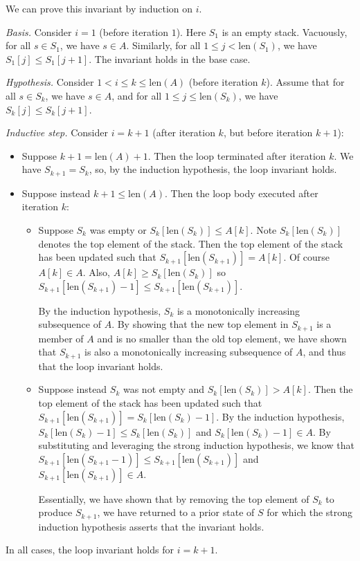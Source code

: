 \begin{enumerate}
\begin{solution}
We can prove this invariant by induction on $i$.

\textit{Basis. }Consider $i=1$ (before iteration $1$). Here $S_1$ is an empty stack. Vacuously, for all $s\in S_1$, we have $s\in A$. Similarly, for all $1\leq j<\text{len}(S_1)$, we have $S_1[j]\leq S_1[j+1]$. The invariant holds in the base case.

\textit{Hypothesis. }Consider $1<i\leq k\leq\text{len}(A)$ (before iteration $k$). Assume that for all $s\in S_k$, we have $s\in A$, and for all $1\leq j\leq\text{len}(S_k)$, we have $S_k[j]\leq S_k[j+1]$.

\textit{Inductive step. }Consider $i=k+1$ (after iteration $k$, but before iteration $k+1$):
\begin{itemize}
\item Suppose $k+1=\text{len}(A)+1$. Then the loop terminated after iteration $k$. We have $S_{k+1}=S_k$, so, by the induction hypothesis, the loop invariant holds.
\item Suppose instead $k+1\leq\text{len}(A)$. Then the loop body executed after iteration $k$:
\begin{itemize}
\item Suppose $S_k$ was empty or $S_k[\text{len}(S_k)]\leq A[k]$. Note $S_k[\text{len}(S_k)]$ denotes the top element of the stack. Then the top element of the stack has been updated such that $S_{k+1}[\text{len}(S_{k+1})]=A[k]$. Of course $A[k]\in A$. Also, $A[k]\geq S_k[\text{len}(S_k)]$ so $S_{k+1}[\text{len}(S_{k+1})-1]\leq S_{k+1}[\text{len}(S_{k+1})]$. 

By the induction hypothesis, $S_k$ is a monotonically increasing subsequence of $A$. By showing that the new top element in $S_{k+1}$ is a member of $A$ and is no smaller than the old top element, we have shown that $S_{k+1}$ is also a monotonically increasing subsequence of $A$, and thus that the loop invariant holds.
\item Suppose instead $S_k$ was not empty and $S_k[\text{len}(S_k)]>A[k]$. Then the top element of the stack has been updated such that $S_{k+1}[\text{len}(S_{k+1})]=S_k[\text{len}(S_k)-1]$. By the induction hypothesis, $S_k[\text{len}(S_k)-1]\leq S_k[\text{len}(S_k)]$ and $S_k[\text{len}(S_k)-1]\in A$. By substituting and leveraging the strong induction hypothesis, we know that $S_{k+1}[\text{len}(S_{k+1}-1)]\leq S_{k+1}[\text{len}(S_{k+1})]$ and $S_{k+1}[\text{len}(S_{k+1})]\in A$.

Essentially, we have shown that by removing the top element of $S_k$ to produce $S_{k+1}$, we have returned to a prior state of $S$ for which the strong induction hypothesis asserts that the invariant holds.
\end{itemize}
\end{itemize}
In all cases, the loop invariant holds for $i=k+1$.


\end{solution}
\end{enumerate}
